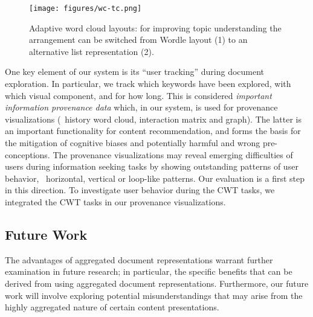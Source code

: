 \begin{figure}
    \centering
    \texttt{[image: figures/wc-tc.png]}
    \caption{Adaptive word cloud layouts: for improving topic understanding the arrangement can be switched from Wordle layout (1) to an alternative list representation (2).}
    \label{fig:wc-tc}
\end{figure}

One key element of our system is its ``user tracking'' during document exploration.
%
In particular, we track which keywords have been explored, with which visual component, and for how long. 
%
This is considered \emph{important information provenance data} which, in our system, is used for provenance visualizations (\eg\ history word cloud, interaction matrix and graph). 
%
The latter is an important functionality for content recommendation, and forms the basis for the mitigation of cognitive biases and potentially harmful and wrong pre-conceptions.
%
The provenance visualizations may reveal emerging difficulties of users during information seeking tasks by showing outstanding patterns of user behavior, \eg\ horizontal, vertical or loop-like patterns. Our evaluation is a first step in this direction. 
%
To investigate user behavior during the CWT tasks, we integrated the CWT tasks in our provenance visualizations.



\subsection{Future Work} \label{sec:future-work}
The advantages of aggregated document representations warrant further examination in future research; in particular, the specific benefits that can be derived from using aggregated document representations. 
%
Furthermore, our future work will involve exploring potential misunderstandings that may arise from the highly aggregated nature of certain content presentations.


